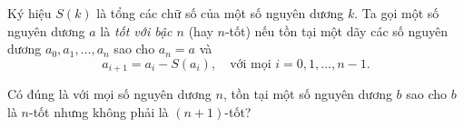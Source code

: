\ifshowproblem
\begin{problem}\label{example:RUS-2015-MO-10-P4}
    Ký hiệu \( S(k) \) là tổng các chữ số của một số nguyên dương \( k \).  
    Ta gọi một số nguyên dương \( a \) là \textit{tốt với bậc \( n \)} (hay \( n \)-tốt) nếu tồn tại một dãy các số nguyên dương 
    \( a_0, a_1, \ldots, a_n \) sao cho \( a_n = a \) và 
    \[
        a_{i+1} = a_i - S(a_i), \quad \text{với mọi } i = 0, 1, \ldots, n-1.
    \]
    
    Có đúng là với mọi số nguyên dương \( n \), tồn tại một số nguyên dương \( b \) sao cho \( b \) là \( n \)-tốt nhưng không phải là \( (n+1) \)-tốt?
\end{problem}
\fi

\footnotemark
{}
\fi